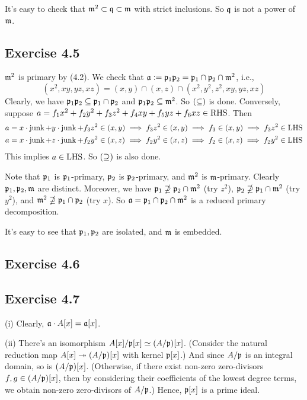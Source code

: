 \documentclass[../A&R.tex]{subfiles}
\begin{document}
It's easy to check that $\mathfrak{m}^2 \subset \mathfrak{q} \subset \mathfrak{m}$ with strict inclusions. So $\mathfrak{q}$ is not a power of $\mathfrak{m}$.

\subsection*{Exercise 4.5}

$\mathfrak{m}^2$ is primary by (4.2). We check that $\mathfrak{a} := \mathfrak{p}_1\mathfrak{p}_2 = \mathfrak{p}_1 \cap \mathfrak{p}_2 \cap \mathfrak{m}^2$, i.e.,
$$
(x^2,xy,yz,xz) = (x,y) \cap (x,z) \cap (x^2,y^2,z^2,xy,yz,xz)
$$
Clearly, we have $\mathfrak{p}_1\mathfrak{p}_2 \subseteq \mathfrak{p}_1 \cap \mathfrak{p}_2$ and $\mathfrak{p}_1\mathfrak{p}_2 \subseteq \mathfrak{m}^2$. So $(\subseteq)$ is done. Conversely, suppose $a=f_1x^2+f_2y^2+f_3z^2+f_4xy+f_5yz+f_6xz \in \operatorname{RHS}$. Then
\begin{align*}
a &= x \cdot \operatorname{junk} + y \cdot \operatorname{junk} + f_3z^2 \in (x,y) \implies f_3z^2 \in (x,y) \implies f_3 \in (x,y) \implies f_3z^2 \in \operatorname{LHS} \\
a &= x \cdot \operatorname{junk} + z \cdot \operatorname{junk} + f_2y^2 \in (x,z) \implies f_2y^2 \in (x,z) \implies f_2 \in (x,z) \implies f_2y^2 \in \operatorname{LHS}
\end{align*}
This implies $a\in\operatorname{LHS}$. So $(\supseteq)$ is also done.

Note that $\mathfrak{p}_1$ is $\mathfrak{p}_1$-primary, $\mathfrak{p}_2$ is $\mathfrak{p}_2$-primary, and $\mathfrak{m}^2$ is $\mathfrak{m}$-primary. Clearly $\mathfrak{p}_1,\mathfrak{p}_2,\mathfrak{m}$ are distinct. Moreover, we have $\mathfrak{p}_1 \nsupseteq \mathfrak{p}_2 \cap \mathfrak{m}^2$ (try $z^2$), $\mathfrak{p}_2 \nsupseteq \mathfrak{p}_1 \cap \mathfrak{m}^2$ (try $y^2$), and $\mathfrak{m}^2 \nsupseteq \mathfrak{p}_1 \cap \mathfrak{p}_2$ (try $x$). So $\mathfrak{a} = \mathfrak{p}_1 \cap \mathfrak{p}_2 \cap \mathfrak{m}^2$ is a reduced primary decomposition.

It's easy to see that $\mathfrak{p}_1,\mathfrak{p}_2$ are isolated, and $\mathfrak{m}$ is embedded.

\subsection*{Exercise 4.6}

\subsection*{Exercise 4.7}

(i) Clearly, $\mathfrak{a} \cdot A[x] = \mathfrak{a}[x]$.

(ii) There's an isomorphism $A[x]/\mathfrak{p}[x] \simeq (A/\mathfrak{p})[x]$. (Consider the natural reduction map $A[x] \twoheadrightarrow (A/\mathfrak{p})[x]$ with kernel $\mathfrak{p}[x]$.) And since $A/\mathfrak{p}$ is an integral domain, so is $ (A/\mathfrak{p})[x]$. (Otherwise, if there exist non-zero zero-divisors $f,g \in (A/\mathfrak{p})[x]$, then by considering their coefficients of the lowest degree terms, we obtain non-zero zero-divisors of $A/\mathfrak{p}$.) Hence, $\mathfrak{p}[x]$ is a prime ideal. 
\end{document}
